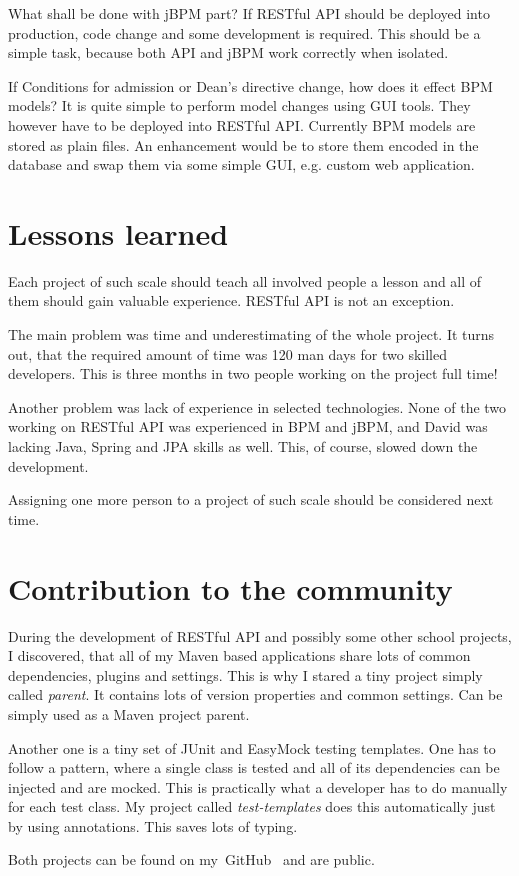 	What shall be done with jBPM part? If RESTful API should be deployed into production, code change and some development
	is required. This should be a simple task, because both API and jBPM work correctly when isolated.
	
	If Conditions for admission or Dean's directive change, how does it effect BPM models? It is quite simple to perform
	model changes using GUI tools. They however have to be deployed into RESTful API. Currently BPM models are stored as
	plain files. An enhancement would be to store them encoded in the database and swap them via some simple GUI, e.g.
	custom web application.

	\section{Lessons learned}

	Each project of such scale should teach all involved people a lesson and all of them should gain valuable experience.
	RESTful API is not an exception.
	
	The main problem was time and underestimating of the whole project. It turns out, that the required amount of time was
	120 man days for two skilled developers. This is three months in two people working on the project full time!
	
	Another problem was lack of experience in selected technologies. None of the two working on RESTful API was experienced
	in BPM and jBPM, and David was lacking Java, Spring and JPA skills as well. This, of course, slowed down the
	development.
	
	Assigning one more person to a project of such scale should be considered next time.

	\section{Contribution to the community}
	
	During the development of RESTful API and possibly some other school projects, I discovered, that all of my Maven based
	applications share lots of common dependencies, plugins and settings. This is why I stared a tiny project simply called
	\textit{parent}. It contains lots of version properties and common settings. Can be simply used as a Maven project
	parent.
	
	Another one is a tiny set of JUnit and EasyMock testing templates. One has to follow a pattern, where a single class is
	tested and all of its dependencies can be injected and are mocked. This is practically what a developer has to do
	manually for each test class. My project called \textit{test-templates} does this automatically just by using
	annotations. This saves lots of typing.
	
	Both projects can be found on my~GitHub~\cite{github} and are public.
